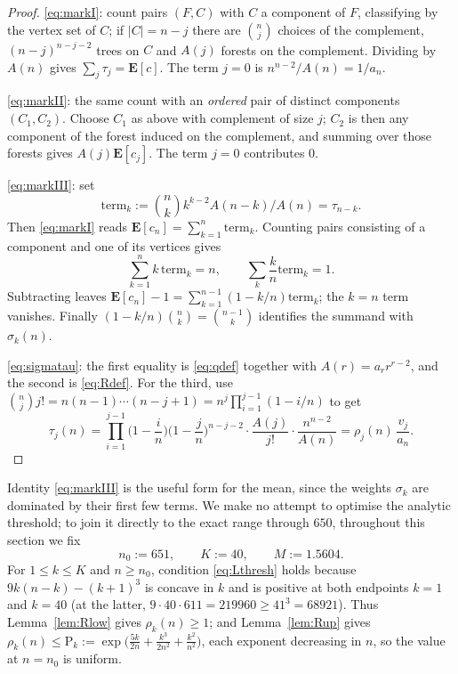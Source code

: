\documentclass[11pt,a4paper]{amsart}
\theoremstyle{plain}
\theoremstyle{definition}
\newcommand{\EX}{\mathbf{E}}
\begin{document}
\begin{proof}
\eqref{eq:markI}: count pairs $(F,C)$ with $C$ a component of $F$, classifying by
the vertex set of $C$; if $|C| = n-j$ there are $\binom{n}{j}$ choices of the
complement, $(n-j)^{n-j-2}$ trees on $C$ and $A(j)$ forests on the complement.
Dividing by $A(n)$ gives $\sum_j \tau_j = \EX[c]$. The term $j=0$ is
$n^{n-2}/A(n)=1/a_n$.

\eqref{eq:markII}: the same count with an \emph{ordered} pair of distinct
components $(C_1,C_2)$. Choose $C_1$ as above with complement of size $j$;
$C_2$ is then any component of the forest induced on the complement, and summing
over those forests gives $A(j)\EX[c_j]$. The term $j=0$ contributes $0$.

\eqref{eq:markIII}: set
\[
  \mathrm{term}_k:=\binom{n}{k}k^{k-2}A(n-k)/A(n)=\tau_{n-k}.
\]
Then \eqref{eq:markI} reads
$\EX[c_n]=\sum_{k=1}^{n}\mathrm{term}_k$. Counting pairs consisting of a
component and one of its vertices gives
\[
  \sum_{k=1}^n k\,\mathrm{term}_k=n,
  \qquad \sum_k\frac{k}{n}\mathrm{term}_k=1.
\]
Subtracting leaves
$\EX[c_n]-1=\sum_{k=1}^{n-1}(1-k/n)\mathrm{term}_k$; the $k=n$ term vanishes.
Finally $(1-k/n)\binom{n}{k}=\binom{n-1}{k}$ identifies the summand with
$\sigma_k(n)$.

\eqref{eq:sigmatau}: the first equality is \eqref{eq:qdef} together with
$A(r)=a_r r^{r-2}$, and the second is \eqref{eq:Rdef}. For the third, use
$\binom{n}{j}j! = n(n-1)\cdots(n-j+1) = n^{j}\prod_{i=1}^{j-1}(1-i/n)$ to get
\[
  \tau_j(n)
  = \prod_{i=1}^{j-1}\Big(1-\frac in\Big)\Big(1-\frac jn\Big)^{n-j-2}
    \cdot\frac{A(j)}{j!}\cdot\frac{n^{n-2}}{A(n)}
  = \rho_j(n)\,\frac{v_j}{a_n}.
\]
\end{proof}

Identity \eqref{eq:markIII} is the useful form for the mean, since the weights
$\sigma_k$ are dominated by their first few terms. We make no attempt to
optimise the analytic threshold; to join it directly to the exact range through
$650$, throughout this section we fix
\[
  n_0 := 651, \qquad K := 40, \qquad M := 1.5604 .
\]
For $1 \le k \le K$ and $n \ge n_0$, condition \eqref{eq:Lthresh} holds
because $9k(n-k)-(k+1)^3$ is concave in $k$ and is positive at both endpoints
$k=1$ and $k=40$ (at the latter,
$9\cdot40\cdot611 = 219960 \ge 41^3 = 68921$). Thus
Lemma~\ref{lem:Rlow} gives $\rho_k(n)\ge 1$; and Lemma~\ref{lem:Rup} gives
$\rho_k(n) \le \mathrm{P}_k := \exp\big(\frac{5k}{2n}+\frac{k^3}{2n^2}
+\frac{k^2}{n^2}\big)$, each exponent decreasing in $n$, so the value at $n=n_0$
is uniform.
\end{document}
